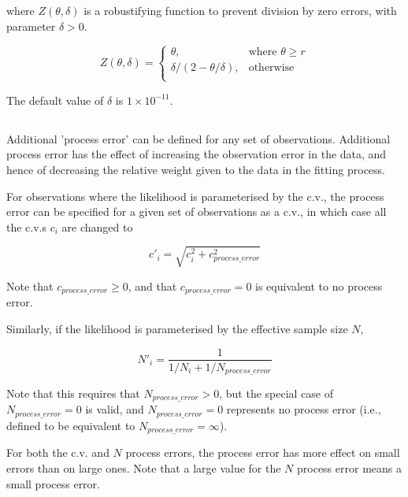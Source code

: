 where $Z \left(\theta,\delta \right)$ is a robustifying function to prevent division by zero errors, with parameter $\delta>0$.

\begin{equation}
Z \left(\theta,\delta \right) = \begin{cases}
\theta, & \text{where $\theta \ge r$} \\
\delta/\left( 2-\theta/\delta \right), & \text{otherwise} \\
\end{cases}
\end{equation}

The default value of $\delta$ is $1 \times 10^{-11}$.

\subsection{}

Additional 'process error' can be defined for any set of observations. Additional process error has the effect of increasing the observation error in the data, and hence of decreasing the relative weight given to the data in the fitting process.

For observations where the likelihood is parameterised by the c.v., the process error can be specified for a given set of observations as a c.v., in which case all the c.v.s $c_i$ are changed to

\begin{equation}
  c'_i  = \sqrt {c_i^2  + c_{process\_error}^2 }
\end{equation}

Note that $c_{process\_ error} \ge 0$, and that $c_{process\_ error} = 0$ is equivalent to no process error.

Similarly, if the likelihood is parameterised by the effective sample size $N$,

\begin{equation}
 N'_i  = \frac{1}{1 / {N_i}+ 1 / N_{process\_error}}
\end{equation}

Note that this requires that $N_{process\_ error} > 0$, but the special case of $N_{process\_ error}=0$ is valid, and $N_{process\_ error}=0$ represents no process error (i.e., defined to be equivalent to $N_{process\_ error}=\infty$).

For both the c.v. and $N$ process errors, the process error has more effect on small errors than on large ones. Note that a large value for the $N$ process error means a small process error.

